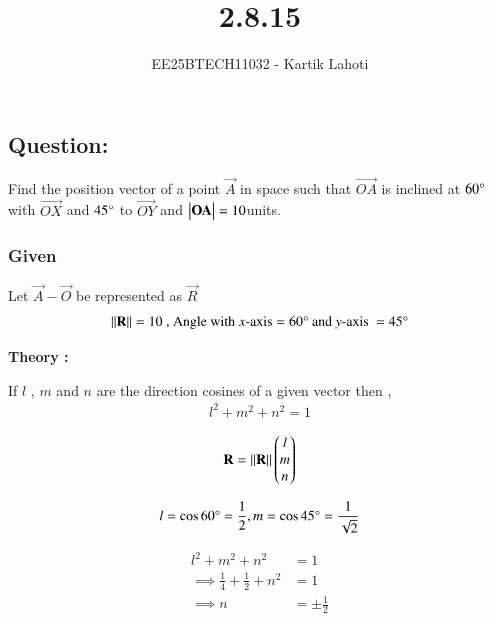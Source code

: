 \documentclass[journal]{IEEEtran}
\numberwithin{equation}{enumi}
\numberwithin{figure}{enumi}
\begin{document}

\vspace{3cm}

\title{2.8.15}
\author{EE25BTECH11032 - Kartik Lahoti}
\maketitle

\subsection*{Question: } 
Find the position vector of a point $\vec{A}$ in space such that $\vec{OA}$ is inclined at $60\degree$ with $\vec{OX}$ and $45\degree$ to $\vec{OY}$ and $\begin{vmatrix}\mathbf{OA}\end{vmatrix} = 10 $units.

\solution 

\subsubsection*{Given }
Let $\vec{A} - \vec{O}$ be represented as $\vec{R}$
\begin{align}
    \left\lVert\mathbf{R}\right\rVert = 10 \text{ , Angle with } x\text{-axis} = 60\degree \text{ and } y\text{-axis } = 45\degree
\end{align}

\textbf{Theory :}

If $l$ , $m$ and $n$ are the direction cosines of a given vector then , 
\begin{align}
    l^2 + m^2 + n^2 = 1 
\end{align}

\begin{align}
    \mathbf{R} = \left\lVert\mathbf{R}\right\rVert \begin{pmatrix}l \\ m \\ n\end{pmatrix}
\end{align}

\begin{align}
    l = \cos{60\degree} = \frac{1}{2} , m = \cos{45\degree} = \frac{1}{\sqrt{2}}
\end{align}

\begin{align}
    l^2 + m^2 + n^2 &= 1\\
    \implies \frac{1}{4} + \frac{1}{2} + n^2  &= 1\\
    \implies n &= \pm \frac{1}{2}
\end{align}
\end{document}
